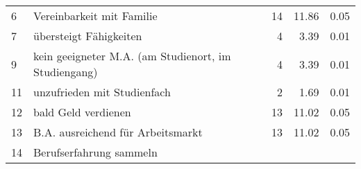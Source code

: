 \begin{longtable}{lXrrr}
     6 &
     \multicolumn{1}{X}{ Vereinbarkeit mit Familie   } &


       \num{14} &
       \num[round-mode=places,round-precision=2]{11.86} &
         \num[round-mode=places,round-precision=2]{0.05} \\

     7 &
     \multicolumn{1}{X}{ übersteigt Fähigkeiten   } &


       \num{4} &
       \num[round-mode=places,round-precision=2]{3.39} &
         \num[round-mode=places,round-precision=2]{0.01} \\

     9 &
     \multicolumn{1}{X}{ kein geeigneter M.A. (am Studienort, im Studiengang)   } &


       \num{4} &
       \num[round-mode=places,round-precision=2]{3.39} &
         \num[round-mode=places,round-precision=2]{0.01} \\

     11 &
     \multicolumn{1}{X}{ unzufrieden mit Studienfach   } &


       \num{2} &
       \num[round-mode=places,round-precision=2]{1.69} &
         \num[round-mode=places,round-precision=2]{0.01} \\

     12 &
     \multicolumn{1}{X}{ bald Geld verdienen   } &


       \num{13} &
       \num[round-mode=places,round-precision=2]{11.02} &
         \num[round-mode=places,round-precision=2]{0.05} \\

     13 &
     \multicolumn{1}{X}{ B.A. ausreichend für Arbeitsmarkt   } &


       \num{13} &
       \num[round-mode=places,round-precision=2]{11.02} &
         \num[round-mode=places,round-precision=2]{0.05} \\

     14 &
     \multicolumn{1}{X}{ Berufserfahrung sammeln   } &



\end{longtable}
